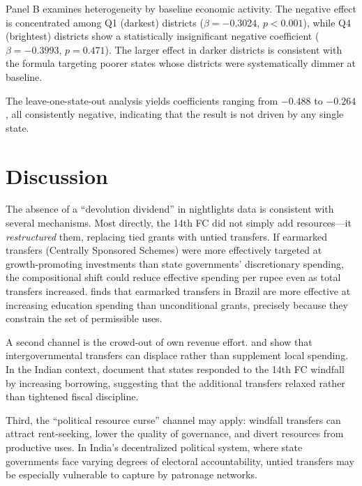 \documentclass[12pt]{article}
\begin{document}
Panel B examines heterogeneity by baseline economic activity. The negative effect is concentrated among Q1 (darkest) districts ($\beta = -0.3024$, $p < 0.001$), while Q4 (brightest) districts show a statistically insignificant negative coefficient ($\beta = -0.3993$, $p = 0.471$). The larger effect in darker districts is consistent with the formula targeting poorer states whose districts were systematically dimmer at baseline.

The leave-one-state-out analysis yields coefficients ranging from $-0.488$ to $-0.264$, all consistently negative, indicating that the result is not driven by any single state.




\section{Discussion}

The absence of a ``devolution dividend'' in nightlights data is consistent with several mechanisms. Most directly, the 14th FC did not simply add resources---it \emph{restructured} them, replacing tied grants with untied transfers. If earmarked transfers (Centrally Sponsored Schemes) were more effectively targeted at growth-promoting investments than state governments' discretionary spending, the compositional shift could reduce effective spending per rupee even as total transfers increased. \citet{gadenne2017tax} finds that earmarked transfers in Brazil are more effective at increasing education spending than unconditional grants, precisely because they constrain the set of permissible uses.

A second channel is the crowd-out of own revenue effort. \citet{knight2002endogenous} and \citet{gordon2004intergovernmental} show that intergovernmental transfers can displace rather than supplement local spending. In the Indian context, \citet{pradhan2017unintended} document that states responded to the 14th FC windfall by increasing borrowing, suggesting that the additional transfers relaxed rather than tightened fiscal discipline.

Third, the \citet{brollo2013federal} ``political resource curse'' channel may apply: windfall transfers can attract rent-seeking, lower the quality of governance, and divert resources from productive uses. In India's decentralized political system, where state governments face varying degrees of electoral accountability, untied transfers may be especially vulnerable to capture by patronage networks.
\end{document}
